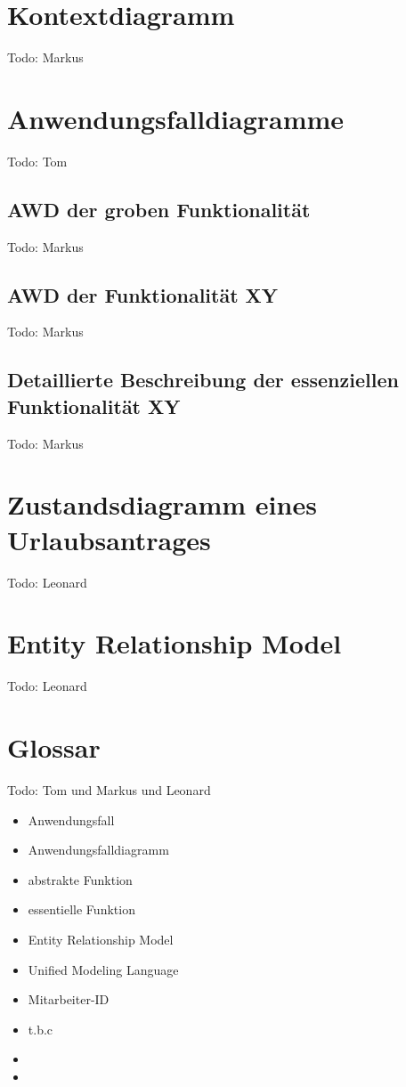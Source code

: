 \chapter{Kontextdiagramm}
Todo: Markus
\chapter{Anwendungsfalldiagramme}
Todo: Tom
\section{AWD der groben Funktionalität}
Todo: Markus
\section{AWD der Funktionalität XY}
Todo: Markus
\section{Detaillierte Beschreibung der essenziellen Funktionalität XY}
Todo: Markus
\chapter{Zustandsdiagramm eines Urlaubsantrages}
Todo: Leonard
\chapter{Entity Relationship Model}
Todo: Leonard
\chapter{Glossar}
Todo: Tom und Markus und Leonard 

\begin{itemize}
	\item Anwendungsfall
	\item Anwendungsfalldiagramm
	\item abstrakte Funktion
	\item essentielle Funktion
	\item Entity Relationship Model
	\item Unified Modeling Language
	\item Mitarbeiter-ID
	\item t.b.c
	\item
	\item 
\end{itemize}



